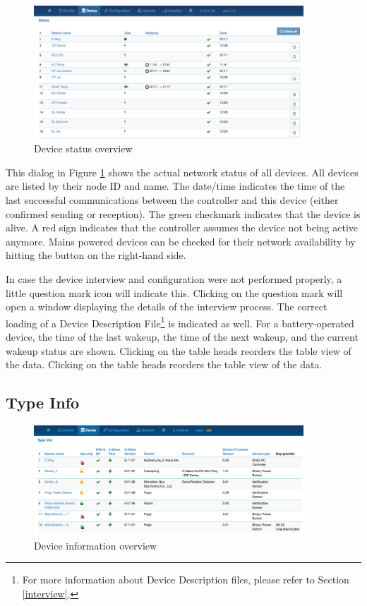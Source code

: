 \begin{figure}
\begin{center}
\includegraphics[width=0.9\textwidth]{pngs/cap7/eui11.png}
\caption{Device status overview}
\label{eui11}
\end{center}
\end{figure}

This dialog in Figure \ref{eui11} shows the actual network status of all devices. All 
devices are listed by their node ID and name. The date/time indicates the time of the 
last successful communications between the controller and this device (either confirmed
 sending or reception). The green checkmark indicates that the device is alive. A red 
 sign indicates that the controller assumes the device not being active anymore. Mains 
 powered devices can be checked for their network availability by hitting the  
 button on the right-hand side.

In case the device interview and configuration were not performed properly, a little 
question mark icon will indicate this. Clicking on the question mark will open a window 
displaying the details of the interview process.
The correct loading of a Device Description File\footnote{For more information about 
Device Description files, please refer to Section \ref{interview}.} is indicated as 
well. For a battery-operated device, the time of the last wakeup, the time of the 
next wakeup, and the current wakeup status are shown. Clicking on the table heads 
reorders the table view of the data. Clicking on the table heads reorders the 
table view of the data.

\subsection{Type Info}

\begin{figure}
\begin{center}
\includegraphics[width=0.9\textwidth]{pngs/security2_1.png}
\caption{Device information overview}
\label{eui12}
\end{center}
\end{figure}

